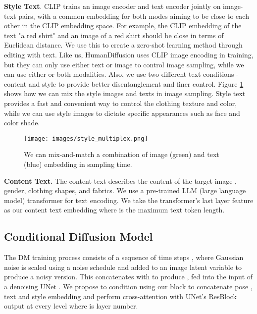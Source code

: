 \documentclass[10pt,twocolumn,letterpaper]{article}
\begin{document}
\noindent\textbf{Style Text}. CLIP \cite{clip} trains an image encoder and text encoder jointly on image-text pairs, with a common embedding for both modes aiming to be close to each other in the CLIP embedding space. For example, the CLIP embedding of the text "a red shirt" and an image of a red shirt should be close in terms of Euclidean distance. We use this to create a zero-shot learning method through editing with text. Like us, HumanDiffusion\cite{human_diffusion} uses CLIP image encoding in training, but they can only use either text or image to control image sampling, while we can use either or both modalities. Also, we use two different text conditions - content and style to provide better disentanglement and finer control. Figure \ref{fig:style_mix} shows how we can mix the style images and texts in image sampling. Style text provides a fast and convenient way to control the clothing texture and color, while we can use style images to dictate specific appearances such as face and color shade.  

\begin{figure}[h]
    \vspace{-2mm}
    \begin{center}
        \texttt{[image: images/style\_multiplex.png]}
    \end{center}
    \vspace{-2mm}
    \caption{We can mix-and-match a combination of image (green) and text (blue) embedding in sampling time.}
    \label{fig:style_mix}
\end{figure}


\noindent\textbf{Content Text.} The content text describes the content of the target image \eg, gender, clothing shapes, and fabrics. We use a pre-trained LLM (large language model) transformer \cite{huggingface_llm} for text encoding. We take the transformer's last layer feature as our content text embedding  where  is the maximum text token length. 

\subsection{Conditional Diffusion Model}
The DM training process consists of a sequence of time steps , where Gaussian noise  is scaled using a noise schedule \cite{diffusion_model} and added to an image latent variable  to produce a noisy version. This concatenates with  to produce , fed into the input of a denoising UNet . We propose to condition using our  block to concatenate   pose , text  and style embedding  and perform cross-attention with  UNet's ResBlock output at every level  where  is layer number.
\vspace{-2mm}
\end{document}
